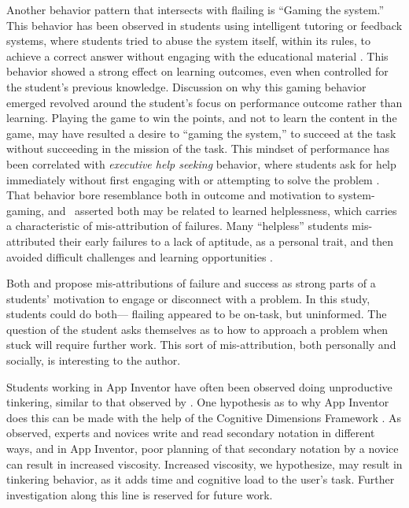 Another behavior pattern that intersects with flailing is ``Gaming the system.'' This behavior has been observed in students using intelligent tutoring or feedback systems, where students tried to abuse the system itself, within its rules, to achieve a correct answer without engaging with the educational material \citep{baker2004off}. This behavior showed a strong effect on learning outcomes, even when controlled for the student's previous knowledge. Discussion on why this gaming behavior emerged revolved around the student's focus on performance outcome rather than learning. Playing the game to win the points, and not to learn the content in the game, may have resulted a desire to ``gaming the system,'' to succeed at the task without succeeding in the mission of the task. This mindset of performance has been correlated with \emph{executive help seeking} behavior, where students ask for help immediately without first engaging with or attempting to solve the problem \citep{arbreton1998student}. That behavior bore resemblance both in outcome and motivation to system-gaming, and \citeauthor{baker2004off}~asserted both may be related to learned helplessness, which carries a characteristic of mis-attribution of failures. Many ``helpless'' students mis-attributed their early failures to a lack of aptitude, as a personal trait, and then avoided difficult challenges and learning opportunities \citep{dweck1988social}. 

Both \citeauthor{wilson-2002} and \citeauthor{baker2004off} propose mis-attributions of failure and success as strong parts of a students' motivation to engage or disconnect with a problem. In this study, students could do both--- flailing appeared to be on-task, but uninformed. The question of the student asks themselves as to how to approach a problem when stuck will require further work. This sort of mis-attribution, both personally and socially, is interesting to the author.

Students working in App Inventor have often been observed doing unproductive tinkering, similar to that observed by \citet{perkins-1986}. One hypothesis as to why App Inventor does this can be made with the help of the Cognitive Dimensions Framework \citep{blackwell-2003}. As \citet{petre-2006} observed, experts and novices write and read secondary notation in different ways, and in App Inventor, poor planning of that secondary notation by a novice can result in increased viscosity. Increased viscosity, we hypothesize, may result in tinkering behavior, as it adds time and cognitive load to the user's task. Further investigation along this line is reserved for future work.


